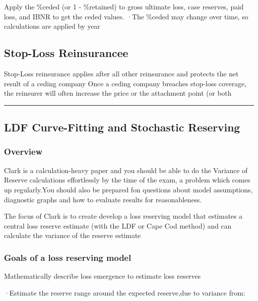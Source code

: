 \documentclass[
]{article}
\begin{document}
Apply the \%ceded (or 1 - \%retained) to gross ultimate loss, case
reserves, paid loss, and IBNR to get the ceded values. ·The \%ceded may
change over time, so calculations are applied by year

\subsection{Stop-Loss Reinsurancee}\label{stop-loss-reinsurancee}

Stop-Loss reinsurance applies after all other reinsurance and protects
the net result of a ceding company Once a ceding company breaches
stop-loss coverage, the reinsurer will often increase the price or the
attachment point (or both

\begin{center}\rule{0.5\linewidth}{0.5pt}\end{center}

\subsection{LDF Curve-Fitting and Stochastic
Reserving}\label{ldf-curve-fitting-and-stochastic-reserving}

\subsubsection{Overview}\label{overview-4}

Clark is a calculation-heavy paper and you should be able to do the
Variance of Reserve calculations effortlessly by the time of the exam, a
problem which comes up regularly.You should also be prepared fon
questions about model assumptions, diagnostic graphs and how to evaluate
results for reasonableness.

The focus of Clark is to create develop a loss reserving model that
estimates a central loss reserve estimate (with the LDF or Cape Cod
method) and can calculate the variance of the reserve estimate

\subsubsection{Goals of a loss reserving
model}\label{goals-of-a-loss-reserving-model}

Mathematically describe loss emergence to estimate loss reserves

·Estimate the reserve range around the expected reserve,due to variance
from:
\end{document}

